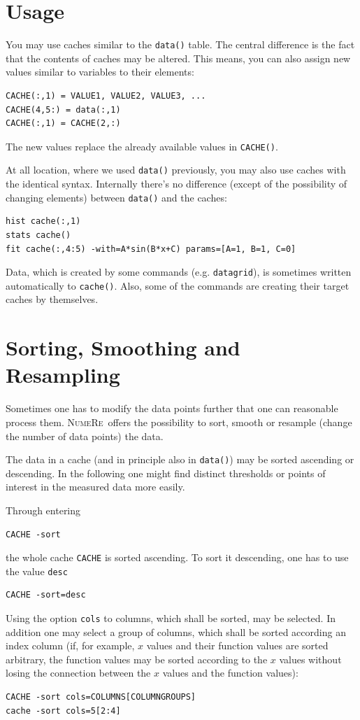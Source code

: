 \documentclass[DIV=14,headsepline,footsepline]{scrbook}
\newcommand{\NR}{\textsc{Nu\-me\-Re}}
\begin{document}
			\section{Usage}
				You may use caches similar to the \verb+data()+ table. The central difference is the fact that the contents of caches may be altered. This means, you can also assign new values similar to variables to their elements:
				\begin{lstlisting}
CACHE(:,1) = VALUE1, VALUE2, VALUE3, ...
CACHE(4,5:) = data(:,1)
CACHE(:,1) = CACHE(2,:)
				\end{lstlisting}
				The new values replace the already available values in \verb+CACHE()+.
				
				At all location, where we used \verb+data()+ previously, you may also use caches with the identical syntax. Internally there's no difference (except of the possibility of changing elements) between \verb+data()+ and the caches:
				\begin{lstlisting}
hist cache(:,1)
stats cache()
fit cache(:,4:5) -with=A*sin(B*x+C) params=[A=1, B=1, C=0]
				\end{lstlisting}
				
				Data, which is created by some commands (e.g. \verb+datagrid+), is sometimes written automatically to \verb+cache()+. Also, some of the commands are creating their target caches by themselves.
			\section{Sorting, Smoothing and Resampling}
				Sometimes one has to modify the data points further that one can reasonable process them. \NR\ offers the possibility to sort, smooth or resample (change the number of data points) the data.
				
				The data in a cache (and in principle also in \verb+data()+) may be sorted ascending or descending. In the following one might find distinct thresholds or points of interest in the measured data more easily.
				
				Through entering
				\begin{lstlisting}
CACHE -sort
				\end{lstlisting}
				the whole cache \verb+CACHE+ is sorted ascending. To sort it descending, one has to use the value \verb+desc+
				\begin{lstlisting}
CACHE -sort=desc
				\end{lstlisting}
				Using the option \verb+cols+ to columns, which shall be sorted, may be selected. In addition one may select a group of columns, which shall be sorted according an index column (if, for example, $x$ values and their function values are sorted arbitrary, the function values may be sorted according to the $x$ values without losing the connection between the  $x$ values and the function values):
				\begin{lstlisting}
CACHE -sort cols=COLUMNS[COLUMNGROUPS]
cache -sort cols=5[2:4]
				\end{lstlisting}
				
\end{document}
